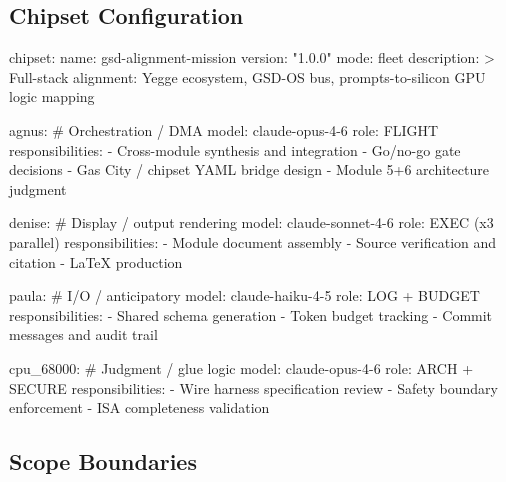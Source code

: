 \documentclass[11pt,letterpaper]{article}
\begin{document}
\subsection{Chipset Configuration}

\begin{asciibox}
chipset:
  name: gsd-alignment-mission
  version: "1.0.0"
  mode: fleet
  description: >
    Full-stack alignment: Yegge ecosystem, GSD-OS bus,
    prompts-to-silicon GPU logic mapping

  agnus:                    # Orchestration / DMA
    model: claude-opus-4-6
    role: FLIGHT
    responsibilities:
      - Cross-module synthesis and integration
      - Go/no-go gate decisions
      - Gas City / chipset YAML bridge design
      - Module 5+6 architecture judgment

  denise:                   # Display / output rendering
    model: claude-sonnet-4-6
    role: EXEC (x3 parallel)
    responsibilities:
      - Module document assembly
      - Source verification and citation
      - LaTeX production

  paula:                    # I/O / anticipatory
    model: claude-haiku-4-5
    role: LOG + BUDGET
    responsibilities:
      - Shared schema generation
      - Token budget tracking
      - Commit messages and audit trail

  cpu_68000:                # Judgment / glue logic
    model: claude-opus-4-6
    role: ARCH + SECURE
    responsibilities:
      - Wire harness specification review
      - Safety boundary enforcement
      - ISA completeness validation
\end{asciibox}

\subsection{Scope Boundaries}
\end{document}

